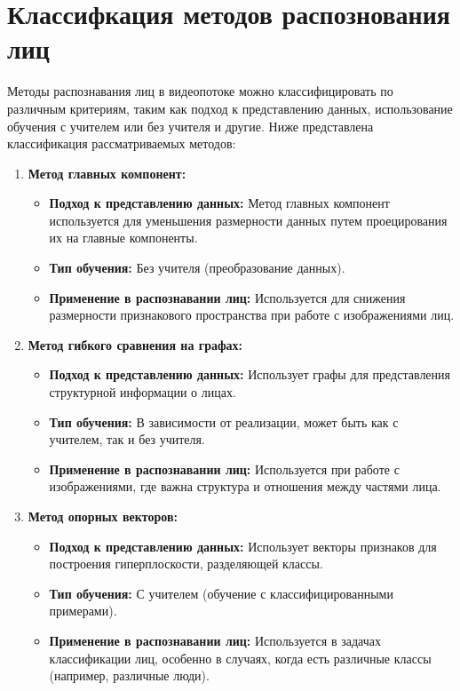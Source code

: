 \chapter{Классифкация методов распознования лиц}

Методы распознавания лиц в видеопотоке можно классифицировать по различным критериям, таким как подход к представлению данных, использование обучения с учителем или без учителя и другие. Ниже представлена классификация рассматриваемых методов:

\begin{enumerate}
    \item\textbf{Метод главных компонент:}
    \begin{itemize}
        \item \textbf{Подход к представлению данных:} Метод главных компонент используется для уменьшения размерности данных путем проецирования их на главные компоненты.
        \item \textbf{Тип обучения:} Без учителя (преобразование данных).
        \item \textbf{Применение в распознавании лиц:} Используется для снижения размерности признакового пространства при работе с изображениями лиц.
    \end{itemize}
    
    \item\textbf{Метод гибкого сравнения на графах:}
    \begin{itemize}
        \item \textbf{Подход к представлению данных:} Использует графы для представления структурной информации о лицах.
        \item \textbf{Тип обучения:} В зависимости от реализации, может быть как с учителем, так и без учителя.
        \item \textbf{Применение в распознавании лиц:} Используется при работе с изображениями, где важна структура и отношения между частями лица.
    \end{itemize}
    
    \item\textbf{Метод опорных векторов:}
    \begin{itemize}
        \item \textbf{Подход к представлению данных:} Использует векторы признаков для построения гиперплоскости, разделяющей классы.
        \item \textbf{Тип обучения:} С учителем (обучение с классифицированными примерами).
        \item \textbf{Применение в распознавании лиц:} Используется в задачах классификации лиц, особенно в случаях, когда есть различные классы (например, различные люди).
    \end{itemize}
    

\end{enumerate}
